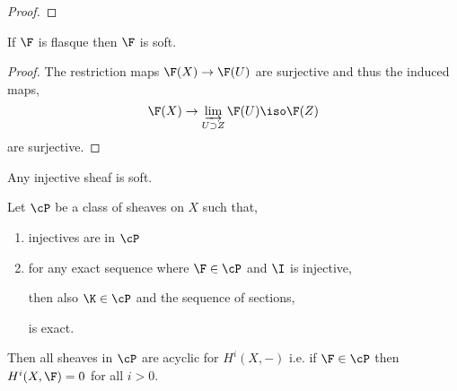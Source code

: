 \documentclass[12pt]{article}
\begin{document}
\begin{proof}

\end{proof}

\begin{lemma}
If $\F$ is flasque then $\F$ is soft.
\end{lemma}

\begin{proof}
The restriction maps $\F(X) \to \F(U)$ are surjective and thus the induced maps,
\[ \F(X) \to \varinjlim_{U \supset Z} \F(U) \iso \F(Z) \]
are surjective.
\end{proof}

\begin{cor}
Any injective sheaf is soft.
\end{cor}

\begin{prop}
Let $\cP$ be a class of sheaves on $X$ such that,
\begin{enumerate}
\item injectives are in $\cP$ 
\item for any exact sequence where $\F \in \cP$ and $\I$ is injective,
\begin{center}
\end{center} 
then also $\K \in \cP$ and the sequence of sections,
\begin{center}
\end{center}
is exact.
\end{enumerate}
Then all sheaves in $\cP$ are acyclic for $H^i(X, -)$ i.e. if $\F \in \cP$ then $H^i(X, \F) = 0$ for all $i > 0$.
\end{prop}
\end{document}
